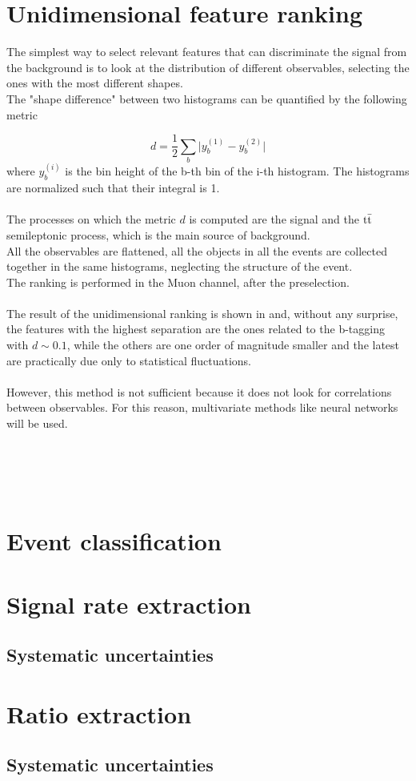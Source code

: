 \begin{minipage}[H]{\linewidth}
\begin{minipage}{0.62\linewidth}
\section{Unidimensional feature ranking}
The simplest way to select relevant features that can discriminate the signal from the background is to look at the distribution of different observables, selecting the ones with the most different shapes.\\
The "shape difference" between two histograms can be quantified by the following metric

\begin{equation}
    d=\frac{1}{2}\sum_b \bigg| y_b^{(1)}-y_b^{(2)} \bigg|
\end{equation}
where $y_b^{(i)}$ is the bin height of the b-th bin of the i-th histogram. The histograms are normalized such that their integral is 1.\\
\\
The processes on which the metric $d$ is computed are the signal and the ${{\text{t}}{\bar{\text{t}}}}$ semileptonic process, which is the main source of background.\\
All the observables are flattened, \ie all the objects in all the events are collected together in the same histograms, neglecting the structure of the event.\\
The ranking is performed in the Muon channel, after the preselection.\\\\
The result of the unidimensional ranking is shown in  and, without any surprise, the features with the highest separation are the ones related to the b-tagging with $d\sim 0.1$, while the others are one order of magnitude smaller and the latest are practically due only to statistical fluctuations.\\
\\
However, this method is not sufficient because it does not look for correlations between observables. For this reason, multivariate methods like neural networks will be used. \\\\\\\\\\    
\end{minipage}
\end{minipage}
\section{Event classification}
\section{Signal rate extraction}
\subsection{Systematic uncertainties}
\section{Ratio extraction}
\subsection{Systematic uncertainties}